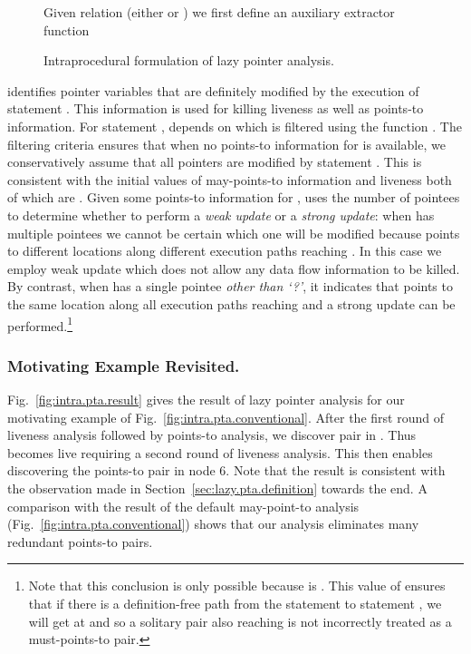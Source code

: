 \documentclass{llncs}
\newcommand{\Start}[1]{\text{{\sf\em start}}\xspace}
\newcommand{\boundary}{\text{\sf\em BI}\xspace}
\newcommand{\pt}[2]{\text{}}
\newcommand{\must}{\text{\sf\em Must\/}\xspace}
\begin{document}
\begin{figure}[!t]
Given relation  (either  or )
we first define an auxiliary extractor function






\caption{Intraprocedural formulation of lazy pointer analysis.}
\label{fig:lazy.pta.dfe}
\end{figure}

 identifies pointer variables that are definitely modified by
the execution of statement . This information is used for killing
liveness as well as points-to information. For statement \text{},
 depends on  which is filtered using the function
\must. The filtering criteria ensures that when no points-to information
for  is available, we conservatively assume that all pointers are
modified by statement \text{}. This is consistent with the
initial values of may-points-to information and liveness both of which
are . Given some points-to information for , \must
uses the number of pointees to determine whether to perform a {\em weak
update\/} or a {\em strong update\/}: when  has multiple pointees
we cannot be certain which one will be modified because  points to
different locations along different execution paths reaching . In
this case we employ weak update which does not allow any data flow
information to be killed. By contrast, when  has a single pointee
{\em other than `?'}, it indicates that  points to the same location
along all execution paths reaching  and a strong update can be
performed.\footnote{ Note that this conclusion is only possible because
\boundary is \text{}. This value of \boundary ensures
that if there is a definition-free path from the \Start{p} statement
to statement , we will get \pt{x}{?} at  and so a solitary
pair \pt{x}{z} also reaching  is not incorrectly treated as a
must-points-to pair.}



\subsubsection{Motivating Example Revisited.}
Fig.~\ref{fig:intra.pta.result} gives the result of
lazy pointer analysis for our motivating example of
Fig.~\ref{fig:intra.pta.conventional}. After the first round of
liveness analysis followed by points-to analysis, we discover pair
\pt{p}{r} in . Thus  becomes live requiring a second round
of liveness analysis. This then enables discovering the points-to pair
\pt{r}{s} in node 6. 
Note that the result is consistent with the observation
made in Section~\ref{sec:lazy.pta.definition} towards the end.
A comparison with the result of the default may-point-to analysis
(Fig.~\ref{fig:intra.pta.conventional}) shows that
our analysis eliminates many redundant points-to pairs. 
\end{document}

